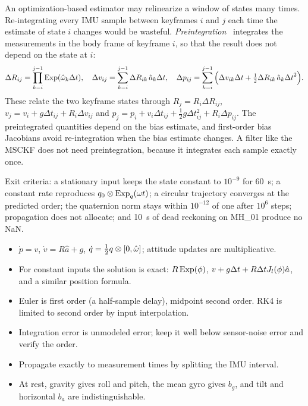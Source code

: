 An optimization-based estimator may relinearize a window of states many times. Re-integrating every IMU
sample between keyframes $i$ and $j$ each time the estimate of state $i$ changes would be wasteful.
\emph{Preintegration}~\cite{lupton2012visual, forster2017preintegration} integrates the measurements in the body frame
of keyframe $i$, so that the result does not depend on the state at $i$:
\begin{equation}
  \Delta R_{ij} = \prod_{k=i}^{j-1}\operatorname{Exp}(\hat\omega_k{\Delta t}), \quad
  \Delta v_{ij} = \sum_{k=i}^{j-1}\Delta R_{ik}\,\hat a_k{\Delta t}, \quad
  \Delta p_{ij} = \sum_{k=i}^{j-1}\Big(\Delta v_{ik}{\Delta t} + \tfrac12\Delta R_{ik}\,\hat a_k{\Delta t}^2\Big).
\end{equation}
These relate the two keyframe states through
$R_j = R_i\Delta R_{ij}$, $v_j = v_i + g\Delta t_{ij} + R_i\Delta v_{ij}$ and
$p_j = p_i + v_i\Delta t_{ij} + \tfrac12g\Delta t_{ij}^2 + R_i\Delta p_{ij}$. The preintegrated quantities depend on the
bias estimate, and first-order bias Jacobians avoid re-integration when the bias estimate changes. A filter
like the MSCKF does not need preintegration, because it integrates each sample exactly once.

\begin{projectlink}[Milestone 4]
Exit criteria: a stationary input keeps the state constant to $10^{-9}$ for 60~s; a constant rate reproduces
$q_0\otimes\operatorname{Exp}_q(\omega t)$; a circular trajectory converges at the predicted order; the quaternion norm stays
within $10^{-12}$ of one after $10^6$ steps; propagation does not allocate; and 10~s of dead reckoning on
MH\_01 produce no NaN.
\end{projectlink}

\begin{takeaways}
\begin{itemize}
  \item $\dot p = v$, $\dot v = R\hat a + g$, $\dot q = \tfrac12 q\otimes[0,\hat\omega]$; attitude updates are multiplicative.
  \item For constant inputs the solution is exact: $R\operatorname{Exp}(\phi)$, $v + g{\Delta t} + R{\Delta t}J_l(\phi)\hat a$, and a similar
        position formula.
  \item Euler is first order (a half-sample delay), midpoint second order. RK4 is limited to second order by
        input interpolation.
  \item Integration error is unmodeled error; keep it well below sensor-noise error and verify the order.
  \item Propagate exactly to measurement times by splitting the IMU interval.
  \item At rest, gravity gives roll and pitch, the mean gyro gives $b_g$, and tilt and horizontal $b_a$ are
        indistinguishable.
\end{itemize}
\end{takeaways}

